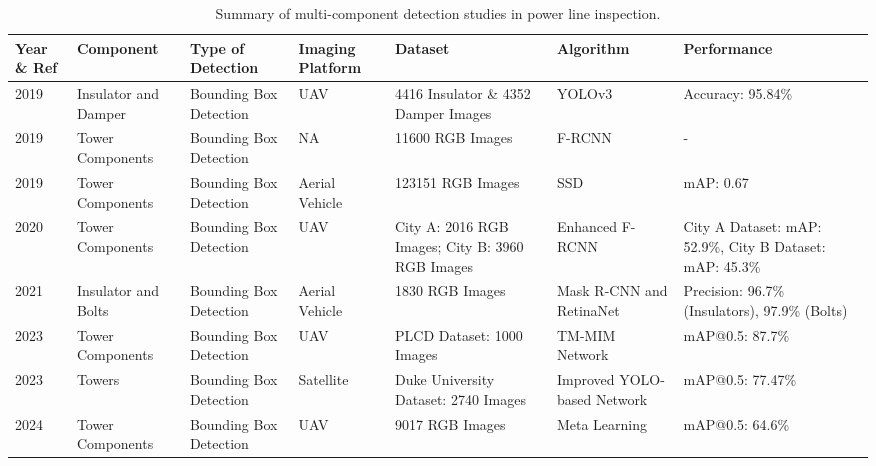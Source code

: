 \begin{table*}[htb]
\scriptsize
\caption{Summary of multi-component detection studies in power line inspection.} \label{tab:multicomponent_detection} 
\begin{tabular}{P{.05} P{.1} P{.15} P{.1} P{.15} P{.1} P{.15}}

\hline
Year \& Ref & Component & Type of Detection & Imaging Platform & Dataset & Algorithm & Performance \\
 \cite{chen_research_2019} & Insulator and Damper & Bounding Box Detection & UAV & 4416 Insulator \& 4352 Damper Images & YOLOv3 & Accuracy: 95.84\% \\

2019 \cite{wang_image_2019} & Tower Components & Bounding Box Detection & NA & 11600 RGB Images & F-RCNN & - \\

2019 \cite{nguyen_intelligent_2019} & Tower Components & Bounding Box Detection & Aerial Vehicle & 123151 RGB Images & SSD & mAP: 0.67 \\

2020 \cite{zhang_multi_scale_2020} & Tower Components & Bounding Box Detection & UAV & City A: 2016 RGB Images; City B: 3960 RGB Images & Enhanced F-RCNN & City A Dataset: mAP: 52.9\%, City B Dataset: mAP: 45.3\% \\

2021 \cite{odo_aerial_2021} & Insulator and Bolts & Bounding Box Detection & Aerial Vehicle & 1830 RGB Images  & Mask R-CNN and RetinaNet & Precision: 96.7\% (Insulators), 97.9\% (Bolts) \\

2023 \cite{liu2023tower} & Tower Components & Bounding Box Detection & UAV & PLCD Dataset: 1000 Images & TM-MIM Network & mAP@0.5: 87.7\% \\

2023 \cite{shi2024lskf} & Towers & Bounding Box Detection & Satellite & Duke University Dataset: 2740 Images & Improved YOLO-based Network & mAP@0.5: 77.47\% \\

2024 \cite{dong2024transmission} & Tower Components & Bounding Box Detection & UAV & 9017 RGB Images & Meta Learning & mAP@0.5: 64.6\% \\
\hline

\end{tabular}
\end{table*}

